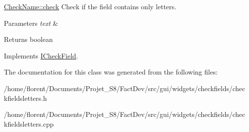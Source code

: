 \hyperlink{classCheckFieldsLetters_a62574deb407fe83456e46381425a7b46}{Check\-Name\-::check} Check if the field contains only letters. 


\begin{DoxyParams}{Parameters}
{\em text} & \\
\hline
\end{DoxyParams}
\begin{DoxyReturn}{Returns}
boolean 
\end{DoxyReturn}


Implements \hyperlink{classICheckField_a6bd42b4d49c165cdd92822135123fd4b}{I\-Check\-Field}.



The documentation for this class was generated from the following files\-:\begin{DoxyCompactItemize}
\item 
/home/florent/\-Documents/\-Projet\-\_\-\-S8/\-Fact\-Dev/src/gui/widgets/checkfields/checkfieldsletters.\-h\item 
/home/florent/\-Documents/\-Projet\-\_\-\-S8/\-Fact\-Dev/src/gui/widgets/checkfields/checkfieldsletters.\-cpp\end{DoxyCompactItemize}
